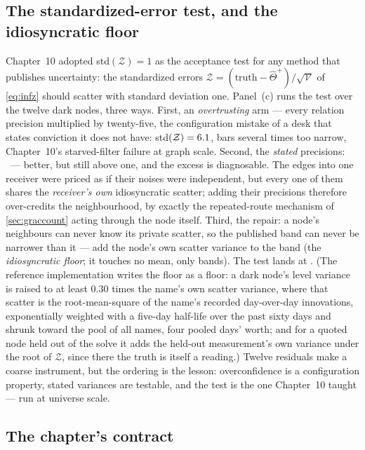 \subsection{The standardized-error test, and the idiosyncratic floor}

Chapter~10 adopted std$(\mathcal{Z})=1$ as the acceptance test for
any method that publishes uncertainty: the standardized errors
$\mathcal{Z}=(\text{truth}-\hat\Theta^{+})/\sqrt{\mathcal{V}}$ of
\cref{eq:infz} should scatter with standard deviation one.
Panel~(c) runs the test over the twelve dark nodes, three ways.
First, an \emph{overtrusting} arm --- every relation precision
multiplied by twenty-five, the configuration mistake of a desk that
states conviction it does not have: std$(\mathcal{Z})
=6.1$, bars several times too narrow, Chapter~10's
starved-filter failure at graph scale.  Second, the \emph{stated}
precisions: \MacGrAuditStated\ --- better, but still above one, and
the excess is diagnosable.  The edges into one receiver were priced
as if their noises were independent, but every one of them shares the
\emph{receiver's own} idiosyncratic scatter; adding their precisions
therefore over-credits the neighbourhood, by exactly the
repeated-route mechanism of \cref{sec:graccount} acting through
the node itself.  Third, the repair: a node's neighbours can never
know its private scatter, so the published band can never be
narrower than it --- add the node's own scatter variance to the band
(the \emph{idiosyncratic floor}; it touches no mean, only bands).
The test lands at \MacGrAuditFloor.  (The reference implementation
writes the floor as a floor: a dark node's level variance is raised
to at least $0.30$ times the name's own scatter variance, where that
scatter is the root-mean-square of the name's recorded day-over-day
innovations, exponentially weighted with a five-day half-life over
the past sixty days and shrunk toward the pool of all names, four
pooled days' worth; and for a quoted node held out of the solve it
adds the held-out measurement's own variance under the root of
$\mathcal{Z}$, since there the truth is itself a reading.)
Twelve residuals make a
coarse instrument, but the ordering is the lesson:
overconfidence is a configuration property, stated variances are
testable, and the test is the one Chapter~10 taught --- run at
universe scale.

\subsection{The chapter's contract}

